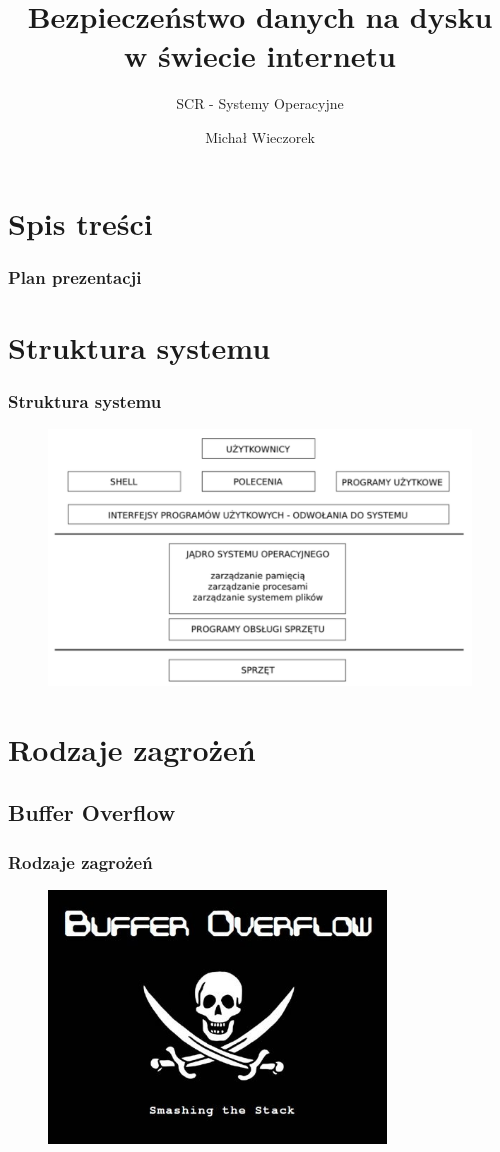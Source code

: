 \documentclass{beamer}
\title{Bezpieczeństwo danych na dysku\\ w świecie internetu}
\subtitle{SCR - Systemy Operacyjne}
\author{Michał Wieczorek}
\institute{
Automatyka i Robotyka,
Wydział Elektroniki\\
Politechnika Wrocławska}
\begin{document}
\begin{frame}
\titlepage
\end{frame}

\section{Spis treści}
\begin{frame}
	\frametitle{Plan prezentacji}
	\tableofcontents
\end{frame}

\section{Struktura systemu}
\begin{frame}
	\frametitle{Struktura systemu}
	\begin{figure}[H]
	\centering
	\includegraphics[width=1\textwidth]{podzial.png}
	\end{figure}
\end{frame}

\section{Rodzaje zagrożeń}
\subsection{Buffer Overflow}
\begin{frame}
	\frametitle{Rodzaje zagrożeń}
	\begin{figure}[H]
	\centering
	\includegraphics[width=0.8\textwidth]{overflow2.png}
	\end{figure}
\end{frame}
\end{document}
